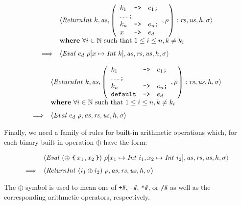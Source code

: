 \documentclass[10pt,a4paper]{exam} %
\begin{document}
\begin{mdframed}
\begin{equation}
\begin{array}{cl}
 & \langle \mathit{ReturnInt}~k, \mathit{as}, \left(\begin{array}{lcl}
 k_1 & \texttt{->} & e_1 \texttt{;} \\
 \multicolumn{3}{l}{\ldots \texttt{;}} \\
 k_n & \texttt{->} & e_n \texttt{;} \\
 x & \texttt{->} & e_d
 \end{array}, \rho\right) : \mathit{rs}, \mathit{us}, h, \sigma \rangle \\
 & \mathbf{where}~\forall i \in \mathbb{N}~\text{such that}~1 \leq i \leq n, k \neq k_i \\[0.25cm]
\Longrightarrow & \langle \mathit{Eval}~e_d~\rho[x \mapsto \mathit{Int}~k], \mathit{as}, \mathit{rs}, \mathit{us}, h, \sigma \rangle
\end{array}
\end{equation}
\end{mdframed}
\begin{mdframed}
\begin{equation}
\begin{array}{cl}
 & \langle \mathit{ReturnInt}~k, \mathit{as}, \left(\begin{array}{lcl}
 k_1 & \texttt{->} & e_1 \texttt{;} \\
 \multicolumn{3}{l}{\ldots \texttt{;}} \\
 k_n & \texttt{->} & e_n \texttt{;} \\
 \texttt{default} & \texttt{->} & e_d
 \end{array}, \rho\right) : \mathit{rs}, \mathit{us}, h, \sigma \rangle \\
 & \mathbf{where}~\forall i \in \mathbb{N}~\text{such that}~1 \leq i \leq n, k \neq k_i \\[0.25cm]
\Longrightarrow & \langle \mathit{Eval}~e_d~\rho, \mathit{as}, \mathit{rs}, \mathit{us}, h, \sigma \rangle
\end{array}
\end{equation}
\end{mdframed}
Finally, we need a family of rules for built-in arithmetic operations which, for each binary built-in operation $\oplus$ have the form:
\begin{mdframed}
\begin{equation}
\begin{array}{cl}
 & \langle \mathit{Eval}~(\oplus~\texttt{\{\,$x_1\texttt{,} x_2$\,\}})~\rho[x_1 \mapsto \mathit{Int}~i_1, x_2 \mapsto \mathit{Int}~i_2], \mathit{as}, \mathit{rs}, \mathit{us}, h, \sigma \rangle \\[0.25cm]
\Longrightarrow & \langle \mathit{ReturnInt}~(i_1 \oplus i_2)~\rho, \mathit{as}, \mathit{rs}, \mathit{us}, h, \sigma \rangle 
\end{array}
\end{equation}
\end{mdframed}
The $\oplus$ symbol is used to mean one of \texttt{+\#}, \texttt{-\#}, \texttt{*\#}, or \texttt{/\#} as well as the corresponding arithmetic operators, respectively.
\end{document}
